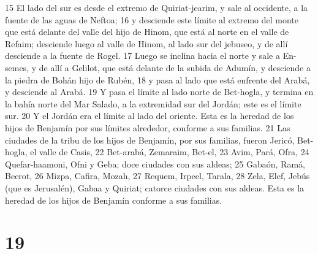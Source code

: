 15 El lado del sur es desde el extremo de Quiriat-jearim, y sale al occidente, a la fuente de las aguas de Neftoa;
16 y desciende este límite al extremo del monte que está delante del valle del hijo de Hinom, que está al norte en el valle de Refaim; desciende luego al valle de Hinom, al lado sur del jebuseo, y de allí desciende a la fuente de Rogel.
17 Luego se inclina hacia el norte y sale a En-semes, y de allí a Gelilot, que está delante de la subida de Adumín, y desciende a la piedra de Bohán hijo de Rubén,
18 y pasa al lado que está enfrente del Arabá, y desciende al Arabá.
19 Y pasa el límite al lado norte de Bet-hogla, y termina en la bahía norte del Mar Salado, a la extremidad sur del Jordán; este es el límite sur.
20 Y el Jordán era el límite al lado del oriente. Esta es la heredad de los hijos de Benjamín por sus límites alrededor, conforme a sus familias.
21 Las ciudades de la tribu de los hijos de Benjamín, por sus familias, fueron Jericó, Bet-hogla, el valle de Casis,
22 Bet-arabá, Zemaraim, Bet-el,
23 Avim, Pará, Ofra,
24 Quefar-haamoni, Ofni y Geba; doce ciudades con sus aldeas;
25 Gabaón, Ramá, Beerot,
26 Mizpa, Cafira, Mozah,
27 Requem, Irpeel, Tarala,
28 Zela, Elef, Jebús (que es Jerusalén), Gabaa y Quiriat; catorce ciudades con sus aldeas. Esta es la heredad de los hijos de Benjamín conforme a sus familias.

\chapter{19}

